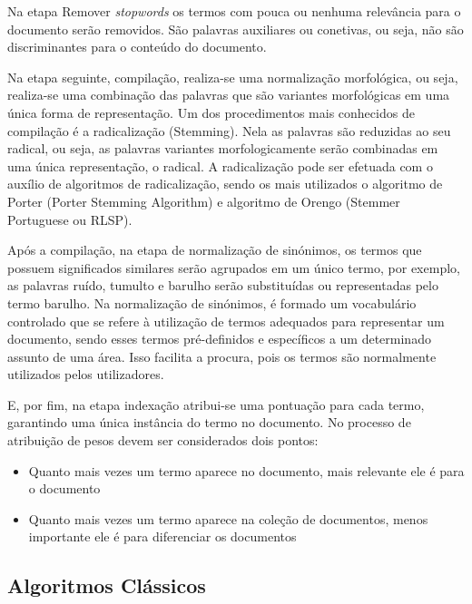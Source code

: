 \documentclass[a4paper,10pt]{article}
\begin{document}
Na etapa Remover \textit{stopwords} os termos com pouca ou nenhuma relevância para o documento serão removidos. 
São palavras auxiliares ou conetivas, ou seja, não são discriminantes para o conteúdo do documento.

Na etapa seguinte, compilação, realiza-se uma normalização morfológica, ou seja, realiza-se uma combinação das palavras que são variantes morfológicas em uma única forma de representação. 
Um dos procedimentos mais conhecidos de compilação é a radicalização (Stemming). Nela as palavras são reduzidas ao seu radical, ou seja, as palavras variantes morfologicamente serão combinadas em uma única representação, o radical. A radicalização pode ser efetuada com o auxílio de algoritmos de radicalização, sendo os mais utilizados o algoritmo de Porter (Porter Stemming Algorithm) e algoritmo de Orengo (Stemmer Portuguese ou RLSP).

Após a compilação, na etapa de normalização de sinónimos, os termos que possuem significados similares serão agrupados em um único termo, por exemplo, as palavras ruído, tumulto e barulho serão substituídas ou representadas pelo termo barulho. 
Na normalização de sinónimos, é formado um vocabulário controlado que se refere à utilização de termos adequados para representar um documento, sendo esses termos pré-definidos e específicos a um determinado assunto de uma área. 
Isso facilita a procura, pois os termos são normalmente utilizados pelos utilizadores.

E, por fim, na etapa indexação atribui-se uma pontuação para cada termo, garantindo uma única instância do termo no documento. 
No processo de atribuição de pesos devem ser considerados dois pontos:
\begin{itemize}
    \item Quanto mais vezes um termo aparece no documento, mais relevante ele é para o documento
    \item Quanto mais vezes um termo aparece na coleção de documentos, menos importante ele é para diferenciar os documentos
\end{itemize}

\subsection{Algoritmos Clássicos}
\end{document}
